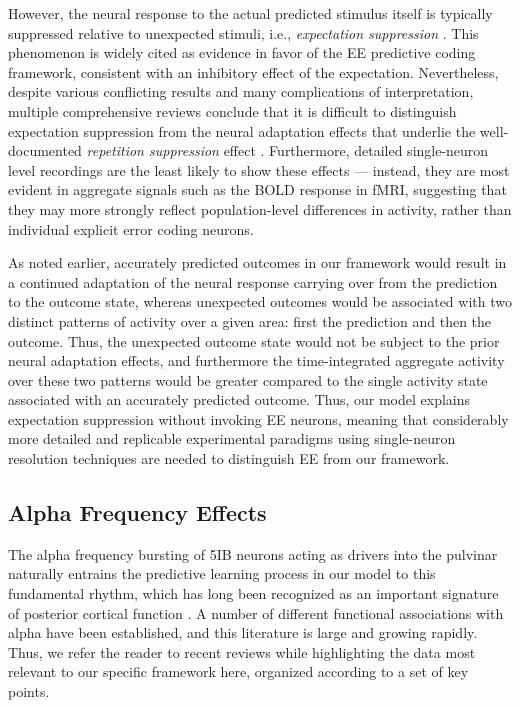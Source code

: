\documentclass[11pt,twoside]{article}
\newif\myifpdf
\begin{document}
However, the neural response to the actual predicted stimulus itself is typically suppressed relative to unexpected stimuli, i.e., \emph{expectation suppression} \citep{SummerfieldTrittschuhMontiEtAl08,TodorovicEdeMarisEtAl11,MeyerOlson11,BastosUsreyAdamsEtAl12}.  This phenomenon is widely cited as evidence in favor of the EE predictive coding framework, consistent with an inhibitory effect of the expectation.  Nevertheless, despite various conflicting results and many complications of interpretation, multiple comprehensive reviews conclude that it is difficult to distinguish expectation suppression from the neural adaptation effects that underlie the well-documented \emph{repetition suppression} effect \citep{WalshMcGovernClarkEtAl20,VinkenVogels17,KokLange15,KokJeheedeLange12,SummerfieldEgner09,LeeMumford03}.  Furthermore, detailed single-neuron level recordings are the least likely to show these effects --- instead, they are most evident in aggregate signals such as the BOLD response in fMRI, suggesting that they may more strongly reflect population-level differences in activity, rather than individual explicit error coding neurons.

As noted earlier, accurately predicted outcomes in our framework would result in a continued adaptation of the neural response carrying over from the prediction to the outcome state, whereas unexpected outcomes would be associated with two distinct patterns of activity over a given area: first the prediction and then the outcome.  Thus, the unexpected outcome state would not be subject to the prior neural adaptation effects, and furthermore the time-integrated aggregate activity over these two patterns would be greater compared to the single activity state associated with an accurately predicted outcome.  Thus, our model explains expectation suppression without invoking EE neurons, meaning that considerably more detailed and replicable experimental paradigms using single-neuron resolution techniques are needed to distinguish EE from our framework.

\subsection{Alpha Frequency Effects}

The alpha frequency bursting of 5IB neurons acting as drivers into the pulvinar naturally entrains the predictive learning process in our model to this fundamental rhythm, which has long been recognized as an important signature of posterior cortical function \citep{Berger29,Walter53,NunnOsselton74,VarelaToroJohnEtAl81,VanRullenKoch03}.  A number of different functional associations with alpha have been established, and this literature is large and growing rapidly.  Thus, we refer the reader to recent reviews \citep{JensenBonnefondMarshallEtAl15,VanRullen16,ClaytonYeungKadosh18,FosterAwh19} while highlighting the data most relevant to our specific framework here, organized according to a set of key points.
\end{document}
